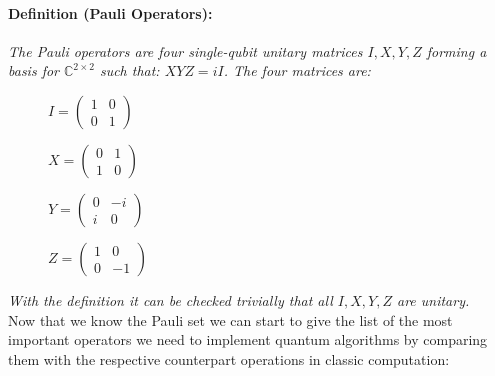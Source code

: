 \documentclass[english]{article}
\begin{document}
				\paragraph{Definition (Pauli Operators):} \emph{The Pauli operators are four single-qubit unitary matrices $I, X, Y, Z$ forming a basis for $\mathbb{C}^{2\times2}$ such that: $XYZ=iI$. The four matrices are:}
				\begin{figure}[h]
					\begin{minipage}{0.5\textwidth}
						\centering
						$
						I = \begin{pmatrix}
								1 & 0 \\
								0 & 1
						\end{pmatrix}
						$\vspace{0.2cm}
					\end{minipage}
					\begin{minipage}{0.5\textwidth}
						\centering
						$
						X = \begin{pmatrix}
								0 & 1 \\
								1 & 0
						\end{pmatrix}
						$\vspace{0.2cm}
					\end{minipage}
					\begin{minipage}{0.5\textwidth}
						\centering
						$
						Y = \begin{pmatrix}
								0 & -i \\
								i & 0
						\end{pmatrix}
						$
					\end{minipage}
					\begin{minipage}{0.5\textwidth}
						\centering
						$
						Z = \begin{pmatrix}
								1 & 0 \\
								0 & -1
						\end{pmatrix}
						$
					\end{minipage}
				\end{figure}
			
			\emph{With the definition it can be checked trivially that all $I, X, Y, Z$ are unitary.}\\
			
			Now that we know the Pauli set we can start to give the list of the most important operators we need to implement quantum algorithms by comparing them with the respective counterpart operations in classic computation:
			
\end{document}
